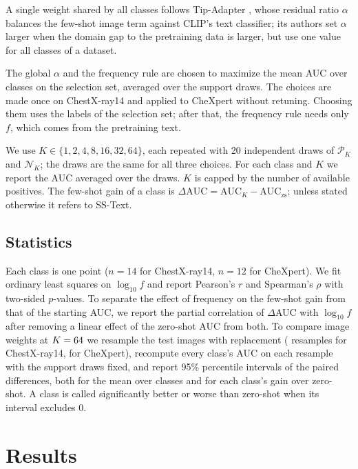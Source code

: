 \documentclass[journal]{IEEEtran}
\begin{document}
A single weight shared by all classes follows Tip-Adapter \cite{zhang2022tip}, whose residual ratio $\alpha$ balances the few-shot image term against CLIP's text classifier; its authors set $\alpha$ larger when the domain gap to the pretraining data is larger, but use one value for all classes of a dataset.

The global $\alpha$ and the frequency rule are chosen to maximize the mean AUC over classes on the selection set, averaged over the support
draws. The choices are made once on ChestX-ray14 and applied to CheXpert without retuning. Choosing them uses
the labels of the selection set; after that, the frequency rule needs only $f$, which comes from the
pretraining text.

We use $K\in\{1,2,4,8,16,32,64\}$, each repeated with 20 independent draws of $\mathcal{P}_K$ and
$\mathcal{N}_K$; the draws are the same for all three choices. For each class and $K$ we report the AUC
averaged over the draws. $K$ is capped by the number of available positives. The few-shot gain of a
class is $\Delta\mathrm{AUC}=\mathrm{AUC}_K-\mathrm{AUC}_{\mathrm{zs}}$; unless stated otherwise it refers
to SS-Text.

\subsection{Statistics}
Each class is one point ($n=14$ for ChestX-ray14, $n=12$ for CheXpert). We fit ordinary least squares on
$\log_{10} f$ and report Pearson's $r$ and Spearman's $\rho$ with two-sided $p$-values. To separate the
effect of frequency on the few-shot gain from that of the starting AUC, we report the partial correlation
of $\Delta$AUC with $\log_{10} f$ after removing a linear effect of the zero-shot AUC from both. To compare
image weights at $K=64$ we resample the test images with replacement (\NihNBoot{} resamples for
ChestX-ray14, \CxpNBoot{} for CheXpert), recompute every class's AUC on each resample with the support
draws fixed, and report 95\% percentile intervals of the paired differences, both for the mean over
classes and for each class's gain over zero-shot. A class is called significantly better or worse than
zero-shot when its interval excludes 0.

\section{Results}
\end{document}
